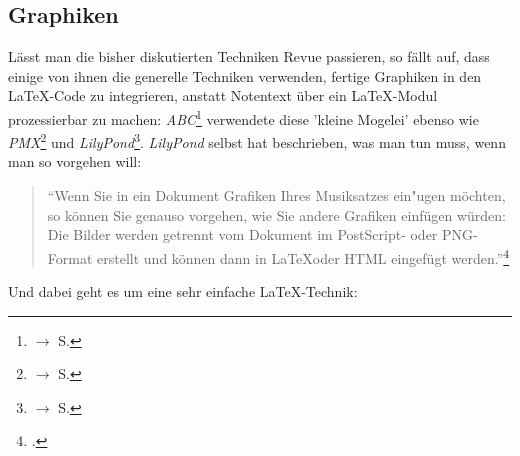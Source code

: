 %
%
%


\subsection{Graphiken}
\label{IncludeGraphics}

Lässt man die bisher diskutierten Techniken Revue passieren, so fällt auf, dass
einige von ihnen die generelle Techniken verwenden, fertige Graphiken in den
LaTeX-Code zu integrieren, anstatt Notentext über ein \LaTeX-Modul prozessierbar
zu machen: \textit{ABC}\footnote{$\rightarrow$ S. \pageref{AbcGraphics}}
verwendete diese 'kleine Mogelei' ebenso wie \textit{PMX}\footnote{$\rightarrow$
S. \pageref{PmxGraphics}} und \textit{LilyPond}\footnote{$\rightarrow$ S.
\pageref{LilyPondGraphics}}. \textit{LilyPond} selbst hat beschrieben, was man tun
muss, wenn man so vorgehen will:

\begin{quote} \begin{textit}
  \enquote{Wenn Sie in ein Dokument Grafiken Ihres Musiksatzes ein"ugen möchten,
  so können Sie genauso vorgehen, wie Sie andere Grafiken einfügen würden: Die
  Bilder werden getrennt vom Dokument im PostScript-  oder PNG-Format erstellt
  und können dann in \LaTeX oder HTML eingefügt werden.}\footcite[vgl.][20]{LilyPond2018e}
\end{textit}\end{quote}

Und dabei geht es um eine sehr einfache \LaTeX-Technik:

